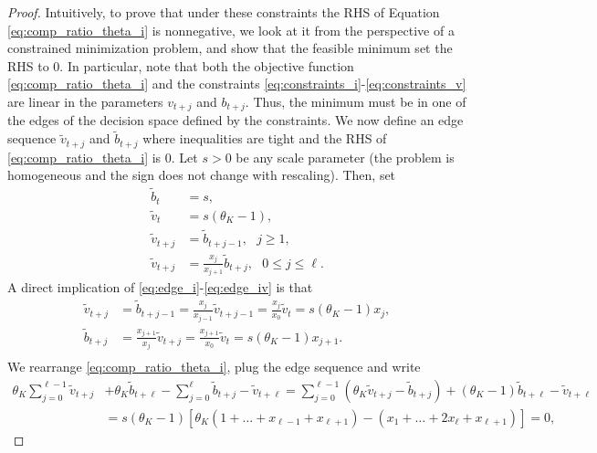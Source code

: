 \begin{proof}
    Intuitively, to prove that under these constraints the RHS of Equation \eqref{eq:comp_ratio_theta_i} is nonnegative, we look at it from the perspective of a constrained minimization problem, and show that the feasible minimum set the RHS to $0$. In particular, note that both the objective function \eqref{eq:comp_ratio_theta_i} and the constraints \eqref{eq:constraints_i}-\eqref{eq:constraints_v} are linear in the parameters $v_{t+j}$ and $b_{t+j}$. Thus, the minimum must be in one of the edges of the decision space defined by the constraints. We now define an edge sequence $\widetilde{v}_{t+j}$ and $\widetilde{b}_{t+j}$ where inequalities are tight and the RHS of \eqref{eq:comp_ratio_theta_i} is $0$. Let $s>0$ be any scale parameter (the problem is homogeneous and the sign does not change with rescaling). Then, set
    \begin{align}
        \widetilde{b}_t&=s, \label{eq:edge_i}\\
        \widetilde{v}_t&=s(\theta_K-1), \label{eq:edge_ii}\\
        \widetilde{v}_{t+j}&=\widetilde{b}_{t+j-1},~~~ j\ge 1, \label{eq:edge_iii}\\
        \widetilde{v}_{t+j}&=\frac{x_j}{x_{j+1}}\widetilde{b}_{t+j},~~~ 0\le j\le \ell. \label{eq:edge_iv}
    \end{align}
    A direct implication of \eqref{eq:edge_i}-\eqref{eq:edge_iv} is that 
    \begin{align*}
        \widetilde{v}_{t+j} &= \widetilde{b}_{t+j-1} =\frac{x_{j}}{x_{j-1}}\widetilde{v}_{t+j-1} = \frac{x_j}{x_0} \widetilde{v}_t =s(\theta_K-1) x_j, \\
        \widetilde{b}_{t+j} &=\frac{x_{j+1}}{x_{j}}\widetilde{v}_{t+j} = \frac{x_{j+1}}{x_0} \widetilde{v}_t =s(\theta_K-1) x_{j+1}. \\
    \end{align*}
    We rearrange \eqref{eq:comp_ratio_theta_i}, plug the edge sequence and write
    \begin{align*}
        \theta_K\sum_{j=0}^{\ell-1}\widetilde{v}_{t+j} &+ \theta_K \widetilde{b}_{t+\ell} - \sum_{j=0}^\ell \widetilde{b}_{t+j} - \widetilde{v}_{t+\ell} = \sum_{j=0}^{\ell-1}(\theta_K \widetilde{v}_{t+j}-\widetilde{b}_{t+j})+(\theta_K-1)\widetilde{b}_{t+\ell}-\widetilde{v}_{t+\ell} \\
        &= s(\theta_K-1) \left[\theta_K(1+\ldots+x_{\ell-1}+x_{\ell+1}) - (x_1 + \ldots + 2x_\ell + x_{\ell+1}) \right] = 0,
    \end{align*}

\end{proof}
